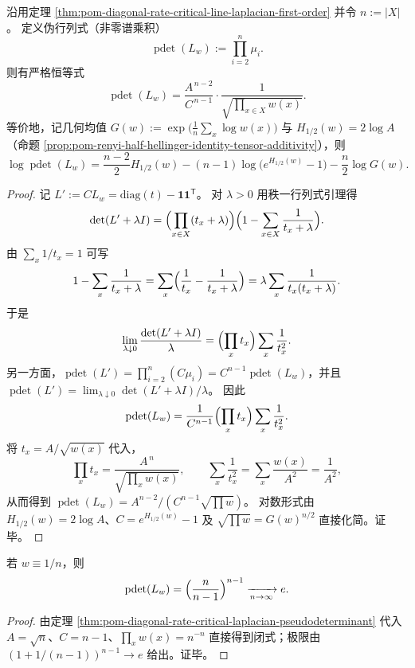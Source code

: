 \begin{theorem}[临界线拉普拉斯的伪行列式闭式]\label{thm:pom-diagonal-rate-critical-laplacian-pseudodeterminant}
沿用定理 \ref{thm:pom-diagonal-rate-critical-line-laplacian-first-order} 并令 \(n:=|X|\)。
定义伪行列式（非零谱乘积）
\[
\operatorname{pdet}(L_w):=\prod_{i=2}^{n}\mu_i.
\]
则有严格恒等式
\[
\operatorname{pdet}(L_w)=\frac{A^{\,n-2}}{C^{\,n-1}}\cdot \frac{1}{\sqrt{\prod_{x\in X}w(x)}}.
\]
等价地，记几何均值
\(
G(w):=\exp\bigl(\frac1n\sum_x\log w(x)\bigr)
\)
与 \(H_{1/2}(w)=2\log A\)（命题 \ref{prop:pom-renyi-half-hellinger-identity-tensor-additivity}），则
\[
\log\operatorname{pdet}(L_w)
=\frac{n-2}{2}H_{1/2}(w)
-(n-1)\log\bigl(e^{H_{1/2}(w)}-1\bigr)
-\frac{n}{2}\log G(w).
\]
\end{theorem}
\begin{proof}
记 \(L':=CL_w=\mathrm{diag}(t)-\mathbf 1\mathbf 1^{\mathsf T}\)。
对 \(\lambda>0\) 用秩一行列式引理得
\[
\det(L'+\lambda I)=\Bigl(\prod_{x\in X}(t_x+\lambda)\Bigr)\Bigl(1-\sum_{x\in X}\frac{1}{t_x+\lambda}\Bigr).
\]
由 \(\sum_x 1/t_x=1\) 可写
\[
1-\sum_{x}\frac{1}{t_x+\lambda}
=\sum_x\Bigl(\frac{1}{t_x}-\frac{1}{t_x+\lambda}\Bigr)
=\lambda\sum_x\frac{1}{t_x(t_x+\lambda)}.
\]
于是
\[
\lim_{\lambda\downarrow 0}\frac{\det(L'+\lambda I)}{\lambda}
=\Bigl(\prod_x t_x\Bigr)\sum_x\frac{1}{t_x^2}.
\]
另一方面，\(\operatorname{pdet}(L')=\prod_{i=2}^n(C\mu_i)=C^{n-1}\operatorname{pdet}(L_w)\)，并且
\(
\operatorname{pdet}(L')=\lim_{\lambda\downarrow 0}\det(L'+\lambda I)/\lambda
\)。
因此
\[
\operatorname{pdet}(L_w)
=\frac{1}{C^{n-1}}\Bigl(\prod_x t_x\Bigr)\sum_x\frac{1}{t_x^2}.
\]
将 \(t_x=A/\sqrt{w(x)}\) 代入，
\[
\prod_x t_x=\frac{A^{\,n}}{\sqrt{\prod_x w(x)}},
\qquad
\sum_x\frac{1}{t_x^2}=\sum_x\frac{w(x)}{A^2}=\frac{1}{A^2},
\]
从而得到 \(\operatorname{pdet}(L_w)=A^{n-2}/(C^{n-1}\sqrt{\prod w})\)。
对数形式由 \(H_{1/2}(w)=2\log A\)、\(C=e^{H_{1/2}(w)}-1\) 及 \(\sqrt{\prod w}=G(w)^{n/2}\) 直接化简。证毕。
\end{proof}



\begin{corollary}[均匀极限的自然常数]\label{cor:pom-diagonal-rate-critical-laplacian-pdet-uniform-limit-e}
若 \(w\equiv 1/n\)，则
\[
\operatorname{pdet}(L_w)=\Bigl(\frac{n}{n-1}\Bigr)^{n-1}\xrightarrow[n\to\infty]{}e.
\]
\end{corollary}
\begin{proof}
由定理 \ref{thm:pom-diagonal-rate-critical-laplacian-pseudodeterminant} 代入 \(A=\sqrt n\)、\(C=n-1\)、\(\prod_x w(x)=n^{-n}\) 直接得到闭式；极限由 \((1+1/(n-1))^{n-1}\to e\) 给出。证毕。
\end{proof}


